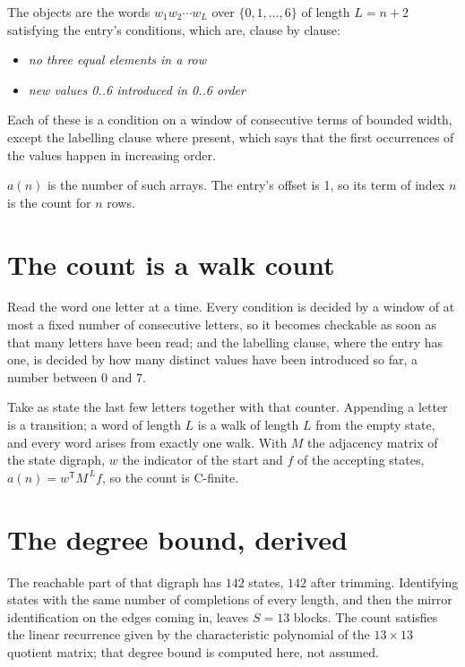 \documentclass[11pt]{article}
\theoremstyle{definition}
\begin{document}
The objects are the words $w_1 w_2 \cdots w_L$ over $\{0,1,\dots,6\}$ of length $L = n + 2$ satisfying the entry's conditions, which are, clause by clause:

\begin{itemize}

\item {\itshape no three equal elements in a row}

\item {\itshape new values 0..6 introduced in 0..6 order}

\end{itemize}

Each of these is a condition on a window of consecutive terms of bounded width, except the labelling clause where present, which says that the first occurrences of the values happen in increasing order.

$a(n)$ is the number of such arrays. The entry's offset is 1, so its term of index $n$ is the count for $n$ rows.

\section{The count is a walk count}

Read the word one letter at a time. Every condition is decided by a window of at most a fixed number of consecutive letters, so it becomes checkable as soon as that many letters have been read; and the labelling clause, where the entry has one, is decided by how many distinct values have been introduced so far, a number between $0$ and 7.

Take as state the last few letters together with that counter. Appending a letter is a transition; a word of length $L$ is a walk of length $L$ from the empty state, and every word arises from exactly one walk. With $M$ the adjacency matrix of the state digraph, $w$ the indicator of the start and $f$ of the accepting states, $a(n) = w^{\mathsf T}M^{\,L}f$, so the count is C-finite.

\section{The degree bound, derived}

The reachable part of that digraph has $142$ states, $142$ after trimming. Identifying states with the same number of completions of every length, and then the mirror identification on the edges coming in, leaves $S = 13$ blocks. The count satisfies the linear recurrence given by the characteristic polynomial of the $13\times13$ quotient matrix; that degree bound is computed here, not assumed.
\end{document}
